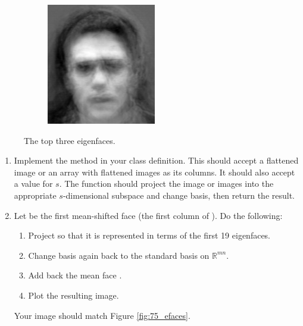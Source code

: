\begin{figure}
\begin{subfigure}[b]{0.3\textwidth}
\end{subfigure}
\begin{subfigure}[b]{0.3\textwidth}
\includegraphics[width=\textwidth]{eigenface2.png}
\end{subfigure}
\caption{The top three eigenfaces.}
\label{facialRecognition:eigenfaces}
\end{figure}



\begin{problem}
\label{prob:top_n}
\leavevmode
\begin{enumerate}
\item Implement the method   in your class definition.
This should accept a flattened image or an array with flattened images as its columns.
It should also accept a value for $s$. 
The function should project the image or images into the appropriate $s$-dimensional subspace and change basis, then return the result.
\item Let  be the first mean-shifted face (the first column of ). Do the following:
\begin{enumerate}
\item Project  so that it is represented in terms of the first 19 eigenfaces.
\item Change basis again back to the standard basis on $\mathbb{R}^{mn}$.
\item Add back the mean face .
\item Plot the resulting image.
\end{enumerate}
Your image should match Figure \ref{fig:75_efaces}.
\end{enumerate}
\end{problem}


